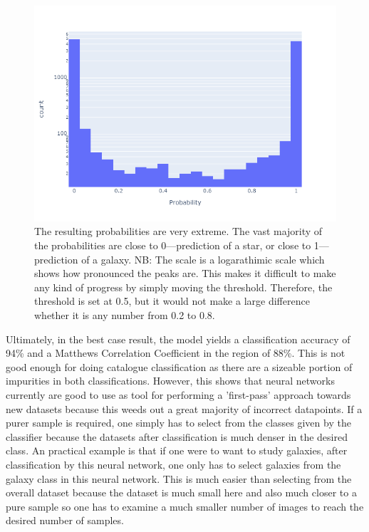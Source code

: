 \documentclass[a4paper,fleqn,usenatbib]{mnras}
\begin{document}
\begin{figure}
\includegraphics[width=\columnwidth]{../Figures/probability}
\caption{The resulting probabilities are very extreme. The vast majority of the probabilities are close to 0---prediction of a star, or close to 1---prediction of a galaxy. NB: The scale is a logarathimic scale which shows how pronounced the peaks are. This makes it difficult to make any kind of progress by simply moving the threshold. Therefore, the threshold is set at 0.5, but it would not make a large difference whether it is any number from 0.2 to 0.8. \label{fig:probability}}
\end{figure}


Ultimately, in the best case result, the model yields a classification accuracy of 94\% and a Matthews Correlation Coefficient in the region of 88\%. This is not good enough for doing catalogue classification as there are a sizeable portion of impurities in both classifications. However, this shows that neural networks currently are good to use as tool for performing a 'first-pass' approach towards new datasets because this weeds out a great majority of incorrect datapoints. If a purer sample is required, one simply has to select from the classes given by the classifier because the datasets after classification is much denser in the desired class. An practical example is that if one were to want to study galaxies, after classification by this neural network, one only has to select galaxies from the galaxy class in this neural network. This is much easier than selecting from the overall dataset because the dataset is much small here and also much closer to a pure sample so one has to examine a much smaller number of images to reach the desired number of samples. 
\end{document}
